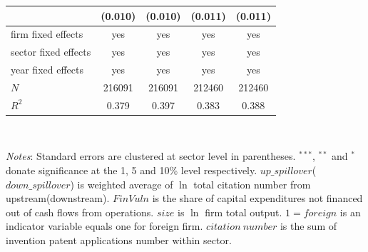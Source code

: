 \documentclass[12pt]{article}%
\begin{document}
\begin{CJK*}{GBK}{fs}
\begin{table}[!h]
{{{\begin{tabular}{l*{4}{c}}
           &    (0.010) &    (0.010) &    (0.011) &    (0.011) \\



           \hline
firm fixed effects      &     yes         &       yes&     yes     &      yes\\
sector fixed effects      &     yes         &       yes&     yes     &      yes\\
year fixed effects      &     yes         &       yes&     yes     &      yes\\
\hline
\(N\)       &     216091 &     216091 &     212460 &     212460 \\
\(R^{2}\)   &     0.379  &      0.397 &      0.383 &      0.388     \\
\hline\hline
\end{tabular}
}\\
}
}
\scriptsize {
\par \emph{Notes}: Standard errors are clustered at sector level in parentheses. $^{***}$, $^{**}$ and $^{*}$ donate significance at the 1, 5 and 10\% level respectively. $up\_spillover$($down\_spillover$) is weighted average of $\ln$ total citation number from upstream(downstream). $FinVuln$ is the share of capital expenditures not financed out of cash flows from operations. $size$ is $\ln$ firm total output. $1=foreign$ is an indicator variable equals one for foreign firm. $citation~number$ is the sum of invention patent applications number within sector.}
\end{table}
\clearpage



\def\sym#1{\ifmmode^{#1}\else\(^{#1}\)\fi}
\begin{table}[!h]
\caption{Vertical Spillovers and TFP: Sector heterogeneity}
\setlength{\abovecaptionskip}{0pt}
\setlength{\belowcaptionskip}{0pt}
{\tiny {
}}
\end{table}
\end{CJK*}
\end{document}
